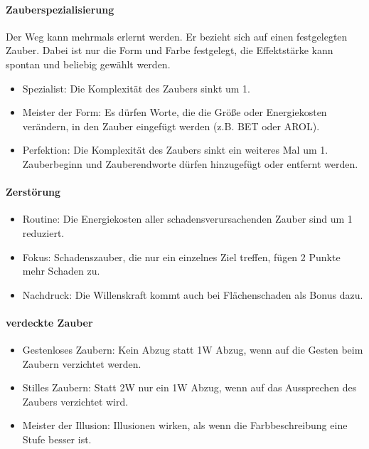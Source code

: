 \documentclass{article}
\begin{document}
\paragraph{Zauberspezialisierung}

Der Weg kann mehrmals erlernt werden. Er bezieht sich auf einen festgelegten Zauber. Dabei ist nur die Form und Farbe
festgelegt, die Effektstärke kann spontan und beliebig gewählt werden.

\begin{itemize}
\item Spezialist: Die Komplexität des Zaubers sinkt um 1.
\item Meister der Form: Es dürfen Worte, die die Größe oder Energiekosten verändern, in den Zauber eingefügt werden (z.B. BET oder AROL).
\item Perfektion: Die Komplexität des Zaubers sinkt ein weiteres Mal um 1. Zauberbeginn und Zauberendworte dürfen hinzugefügt oder entfernt werden.
\end{itemize}

\paragraph{Zerstörung}

\begin{itemize}
\item Routine: Die Energiekosten aller schadensverursachenden Zauber sind um 1 reduziert.
\item Fokus: Schadenszauber, die nur ein einzelnes Ziel treffen, fügen 2 Punkte mehr Schaden zu.
\item Nachdruck: Die Willenskraft kommt auch bei Flächenschaden als Bonus dazu.
\end{itemize}

\paragraph{verdeckte Zauber}

\begin{itemize}
\item Gestenloses Zaubern: Kein Abzug statt 1W Abzug, wenn auf die Gesten beim Zaubern verzichtet werden.
\item Stilles Zaubern: Statt 2W nur ein 1W Abzug, wenn auf das Aussprechen des Zaubers verzichtet wird.
\item Meister der Illusion: Illusionen wirken, als wenn die Farbbeschreibung eine Stufe besser ist.
\end{itemize}
\end{document}
